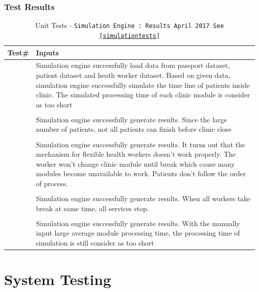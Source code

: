 \documentclass[12pt]{article}
\newcounter{ResultCounter}
\begin{document}
\subsubsection{Test Results}
\begin{center}
	\begin{longtable}{c>{\raggedright\arraybackslash}p{8.8cm} }
		\caption{Unit Tests - \texttt{Simulation Engine : Results April 2017 See \ref{simulationtests}}}\label{SimulationEngine_unit_results}\\
		\toprule
		\bf Test\# & \bf Inputs \\\midrule
		{ResultCounter}\arabic{ResultCounter}
		& Simulation engine successfully load data from passport dataset, patient dataset and heath worker dataset. Based on given data, simulation engine successfully simulate the time line of patients inside clinic. The simulated processing time of each clinic module is consider as too short\\
		\\\midrule
		{ResultCounter}\arabic{ResultCounter}
		& Simulation engine successfully generate results. Since the large number of patients, not all patients can finish before clinic close\\
		\\\midrule
		{ResultCounter}\arabic{ResultCounter}
		& Simulation engine successfully generate results. It turns out that the mechanism for flexible health workers doesn't work properly. The worker won't change clinic module until break which cause many modules become unavailable to work. Patients don't follow the order of process.\\
		\\\midrule
		{ResultCounter}\arabic{ResultCounter}
		& Simulation engine successfully generate results. When all workers take break at same time, all services stop. \\
		\\\midrule
		{ResultCounter}\arabic{ResultCounter}
		& Simulation engine successfully generate results. With the manually input large average module processing time, the processing time of simulation is still consider as too short\\
		\bottomrule
	\end{longtable}
\end{center}




\section{System Testing}
\end{document}
